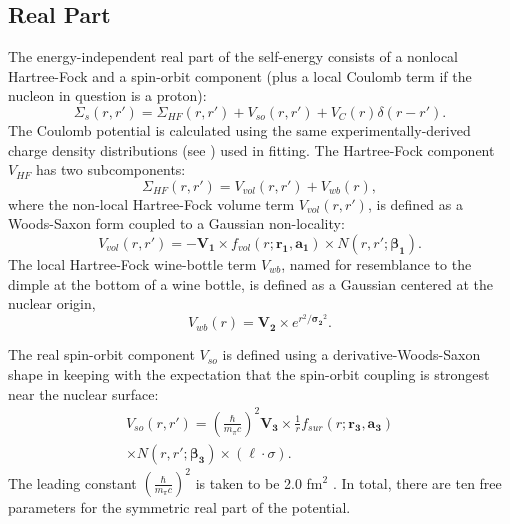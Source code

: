 \documentclass[twocolumn,secnumarabic,amssymb, nobibnotes, aps, prl,
superscriptaddress, nobalancelastpage, draft]{revtex4}
\begin{document}
\subsection{Real Part}
The energy-independent real part of the self-energy consists of a nonlocal Hartree-Fock and
a spin-orbit component (plus a local Coulomb term if the nucleon in question is a proton):
\begin{equation}
    \Sigma_{s}(r,r') =
    \Sigma_{HF}(r,r')+V_{so}(r,r')+V_{C}(r)\delta(r-r').
\end{equation}
The Coulomb potential is calculated using the same experimentally-derived charge
density distributions (see \cite{DeVries1987}) used in fitting.
The Hartree-Fock component $V_{HF}$ has two subcomponents:
\begin{equation} \label{HFWBEquation}
    \Sigma_{HF}(r,r') = V_{vol}(r,r') + V_{wb}(r),
\end{equation}
where the non-local Hartree-Fock volume term $V_{vol}(r,r')$, is defined as
a Woods-Saxon form coupled to a Gaussian non-locality:
\begin{equation} \label{RealVolume}
    V_{vol}(r,r') = -\mathbf{V_{1}}{\times}f_{vol}(r; \mathbf{r_{1}}, \mathbf{a_{1}})
    {\times}N(r,r';\boldsymbol{\beta_{1}}).
\end{equation}
The local Hartree-Fock wine-bottle
term $V_{wb}$, named for resemblance to the dimple at the bottom of a wine
bottle, is defined as a Gaussian centered at the nuclear origin,
\begin{equation}
    V_{wb}(r) = \mathbf{V_{2}}{\times}e^{r^{2}/\boldsymbol{\sigma_{2}}^{2}}.
\end{equation}

The real spin-orbit component $V_{so}$ is defined using a derivative-Woods-Saxon
shape in keeping with the expectation that the spin-orbit coupling is strongest near the
nuclear surface:
\begin{equation} \label{RealSOEquation}
    \begin{split}
        V_{so}(r,r') = \left(\frac{\hbar}{m_{\pi}c}\right)^{2}
        \mathbf{V_{3}}\times\frac{1}{r}f_{sur}(r;\mathbf{r_{3}}, \mathbf{a_{3}})\\
        {\times}N(r,r';\boldsymbol{\beta_{3}}) {\times}(\ell\cdot\sigma).
    \end{split}
\end{equation}
The leading constant $\left(\frac{\hbar}{m_{\pi}c}\right)^{2}$ is taken to be 2.0 fm$^{2}$
\cite{MahzoonPhDThesis}. In total, there are ten free parameters for the
symmetric real part of the potential.
\end{document}
